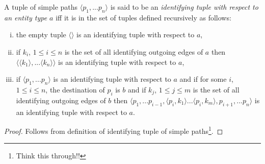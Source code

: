 \documentclass[10pt,a4paper]{article}
\newcommand{\simplepath}[2]{
\ncline[linestyle=dotted,linewidth=0.1pt]{#1}{#2}
\ncput[npos=0.05]{\pnode{dot#21}}
\ncput[npos=0.27]{\dotnode[dotsize=1pt]{dot#22}}
\ncput[npos=0.50]{\dotnode[dotsize=1pt]{dot#23}}
\ncput[npos=0.80]{\dotnode[dotsize=1pt]{dot#24}}
\ncput[npos=0.975]{\pnode{dot#25}}
\ncline[nodesep=3pt]{->}{dot#21}{dot#22}
\ncline[nodesep=3pt]{->}{dot#22}{dot#23}
\ncline[nodesep=3pt]{->}{dot#24}{dot#25}
\ncline[linestyle=dotted,nodesep=10pt]{dot#23}{dot#24}
}
\newcommand{\simplepatha}[3]{
\simplepath{#2}{#3}
\naput[labelsep=1pt]{#1}
}
\newcommand{\simplepathb}[3]{
\simplepath{#2}{#3}
\nbput[labelsep=1pt]{#1}
}
\newcommand{\term}[1]{\textit{{#1}}}
\begin{document}
\begin{definition}
A tuple of simple paths $\langle p_1,...p_n \rangle$ is said to be an 
\term{identifying tuple with respect to an entity type $a$}
iff it is in the set of tuples defined recursively as follows:
\begin{enumerate}[(i)]
\item{
the empty tuple $\langle \rangle$ is an identifying tuple with respect to $a$,
}

\item{
if $k_i$, $1 \leq i \leq n$ is the set of all identifying outgoing edges of $a$ then
$\langle \langle k_1 \rangle ,... \langle k_n \rangle \rangle$ is an identifying tuple with respect to $a$,
}

\item{
if $\langle p_1,...p_n \rangle$ is an identifying tuple with respect to $a$ and if for some $i$, $1 \leq i \leq n$, the
destination of $p_i$ is $b$ and if $k_j$, $1 \leq j \leq m$ is the set of all identifying outgoing edges of $b$
then $\langle p_1,...p_{i-1},\langle p_i,k_1 \rangle ... \langle p_i,k_m \rangle, p_{i+1},...p_n \rangle$ is an identifying tuple with respect to $a$.
}

\end{enumerate}

\end{definition}

\begin{proof}
Follows from definition of identifying tuple of simple paths\footnote{Think this through!!}.
\end{proof}
\end{document}
